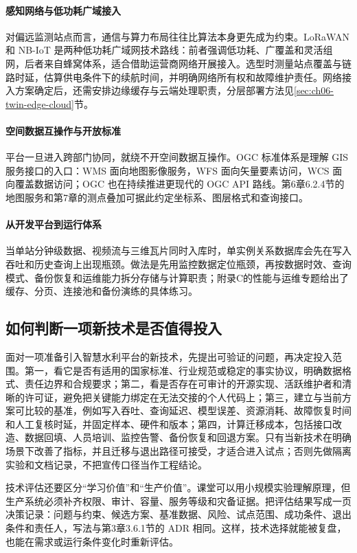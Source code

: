\paragraph{感知网络与低功耗广域接入}对偏远监测站点而言，通信与算力布局往往比算法本身更先成为约束。LoRaWAN 和 NB-IoT 是两种低功耗广域网技术路线：前者强调低功耗、广覆盖和灵活组网，后者来自蜂窝体系，适合借助运营商网络开展接入\cite{lorawan104,nbiot3gpp2016}。选型时测量站点覆盖与链路时延，估算供电条件下的续航时间，并明确网络所有权和故障维护责任。网络接入方案确定后，还需安排边缘缓存与云端处理职责，分层部署方法见\ref{sec:ch06-twin-edge-cloud}节。

\paragraph{空间数据互操作与开放标准}平台一旦进入跨部门协同，就绕不开空间数据互操作。OGC 标准体系是理解 GIS 服务接口的入口：WMS 面向地图影像服务，WFS 面向矢量要素访问，WCS 面向覆盖数据访问；OGC 也在持续推进更现代的 OGC API 路线\cite{ogcStandardsOverview,ogcWMS,ogcWFS,ogcWCS}。第6章6.2.4节的地图服务和第7章的测点叠加可据此约定坐标系、图层格式和查询接口。

\paragraph{从开发平台到运行体系}当单站分钟级数据、视频流与三维瓦片同时入库时，单实例关系数据库会先在写入吞吐和历史查询上出现瓶颈。做法是先用监控数据定位瓶颈，再按数据时效、查询模式、备份恢复和运维能力拆分存储与计算职责；附录C的性能与运维专题给出了缓存、分页、连接池和备份演练的具体练习。

\subsection{如何判断一项新技术是否值得投入}

面对一项准备引入智慧水利平台的新技术，先提出可验证的问题，再决定投入范围。第一，看它是否有适用的国家标准、行业规范或稳定的事实协议，明确数据格式、责任边界和合规要求；第二，看是否存在可审计的开源实现、活跃维护者和清晰的许可证，避免把关键能力绑定在无法交接的个人代码上；第三，建立与当前方案可比较的基准，例如写入吞吐、查询延迟、模型误差、资源消耗、故障恢复时间和人工复核时延，并固定样本、硬件和版本；第四，计算迁移成本，包括接口改造、数据回填、人员培训、监控告警、备份恢复和回退方案。只有当新技术在明确场景下改善了指标，并且迁移与退出路径可接受，才适合进入试点；否则先做隔离实验和文档记录，不把宣传口径当作工程结论。

技术评估还要区分“学习价值”和“生产价值”。课堂可以用小规模实验理解原理，但生产系统必须补齐权限、审计、容量、服务等级和灾备证据。把评估结果写成一页决策记录：问题与约束、候选方案、基准数据、风险、试点范围、成功条件、退出条件和责任人，写法与第3章3.6.1节的 ADR 相同。这样，技术选择就能被复盘，也能在需求或运行条件变化时重新评估。

